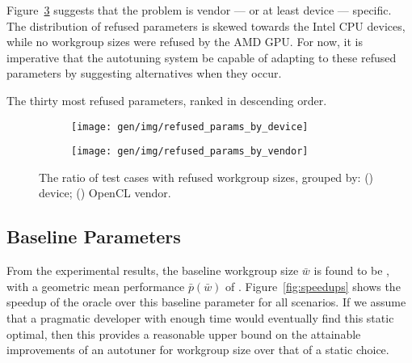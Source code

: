 Figure~\ref{fig:refused-params-by-dev-vendor} suggests that the
problem is vendor --- or at least device --- specific. The
distribution of refused parameters is skewed towards the Intel CPU
devices, while no workgroup sizes were refused by the AMD
GPU.  For now, it is imperative that the
autotuning system be capable of adapting to these refused parameters
by suggesting alternatives when they occur.

\begin{table}
\parbox{.32\linewidth}{
    \centering
    \scriptsize
    
  }
  \hfill
  \parbox{.32\linewidth}{
    \centering
    \scriptsize
    
  }
  \hfill
  \parbox{.32\linewidth}{
    \centering
    \scriptsize
    
  }
  \caption{The thirty most refused parameters, ranked in descending
    order.}
  \label{tab:top-refused-params}
\end{table}

\begin{figure}
\centering
\begin{subfigure}[h]{.45\textwidth}
  \centering
  \texttt{[image: gen/img/refused\_params\_by\_device]}
  \caption{}
  \label{fig:refused-params-by-device}
\end{subfigure}
\hfill
\begin{subfigure}[h]{.45\textwidth}
  \centering
  \texttt{[image: gen/img/refused\_params\_by\_vendor]}
  \caption{}
  \label{fig:refused-params-by-vendor}
\end{subfigure}
\caption{%
  The ratio of test cases with refused workgroup sizes, grouped by:
  () device;
  () OpenCL vendor.%
}
\label{fig:refused-params-by-dev-vendor}
\end{figure}



\subsection{Baseline Parameters}

From the experimental results, the baseline workgroup size $\bar{w}$
is found to be , with a geometric mean performance
$\bar{p}(\bar{w})$ of
. Figure~\ref{fig:speedups} shows the speedup of
the oracle over this baseline parameter for all scenarios. If we
assume that a pragmatic developer with enough time would eventually
find this static optimal, then this provides a reasonable upper bound
on the attainable improvements of an autotuner for workgroup size over
that of a static choice.


